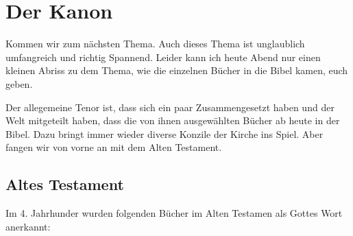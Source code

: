 \section{Der Kanon}

Kommen wir zum nächsten Thema. Auch dieses Thema ist unglaublich umfangreich und richtig Spannend. Leider kann ich heute Abend nur einen kleinen Abriss zu dem Thema, wie die einzelnen Bücher in die Bibel kamen, euch geben.

Der allegemeine Tenor ist, dass sich ein paar Zusammengesetzt haben und der Welt mitgeteilt haben, dass die von ihnen ausgewählten Bücher ab heute in der Bibel. Dazu bringt immer wieder diverse Konzile der Kirche ins Spiel. Aber fangen wir von vorne an mit dem Alten Testament.
\subsection{Altes Testament}
Im 4. Jahrhunder \vChr{} wurden folgenden Bücher im Alten Testamen als Gottes Wort anerkannt:

